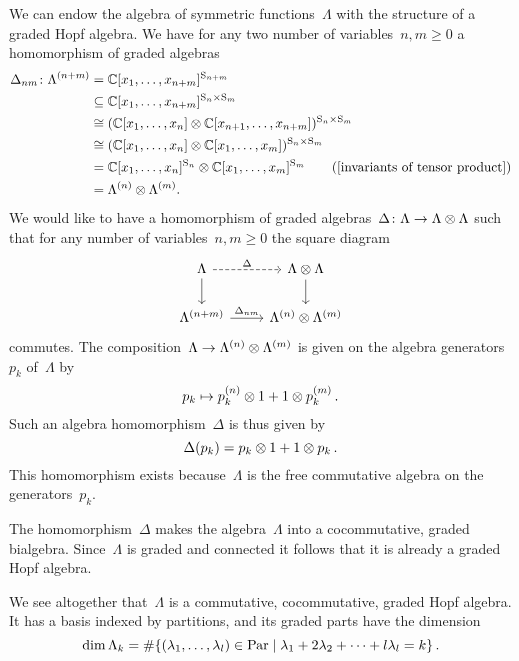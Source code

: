 \documentclass[a4paper,11pt]{scrartcl}
\begin{document}
We can endow the algebra of symmetric functions~$\Lambda$ with the structure of a graded Hopf algebra.
We have for any two number of variables~$n, m \geq 0$ a homomorphism of graded algebras
\begin{align*}
  \Delta_{nm}
  \colon
  \Lambda^{(n+m)}
  &=
  \Complex[x_1, \dotsc, x_{n+m}]^{\symm_{n+m}}
  \\
  &\subseteq
  \Complex[x_1, \dotsc, x_{n+m}]^{\symm_n \times \symm_m}
  \\
  &\cong
  ( \Complex[x_1, \dotsc, x_n] \tensor \Complex[x_{n+1}, \dotsc, x_{n+m}] )^{\symm_n \times \symm_m}
  \\
  &\cong
  ( \Complex[x_1, \dotsc, x_n] \tensor \Complex[x_1, \dotsc, x_m] )^{\symm_n \times \symm_m}
  \\
  &=
  \Complex[x_1, \dotsc, x_n]^{\symm_n} \tensor \Complex[x_1, \dotsc, x_m]^{\symm_m}
  \tag{\cref{invariants of tensor product}}
  \\
  &=
  \Lambda^{(n)} \tensor \Lambda^{(m)}.
\end{align*}
We would like to have a homomorphism of graded algebras~$\Delta \colon \Lambda \to \Lambda \otimes \Lambda$ such that for any number of variables~$n, m \geq 0$ the square diagram
\[
  \begin{tikzcd}
    \Lambda
    \arrow[dashed]{r}[above]{\Delta}
    \arrow{d}
    &
    \Lambda \tensor \Lambda
    \arrow{d}
    \\
    \Lambda^{(n+m)}
    \arrow{r}[above]{\Delta_{nm}}
    &
    \Lambda^{(n)} \tensor \Lambda^{(m)}
  \end{tikzcd}
\]
commutes.
The composition~$\Lambda \to \Lambda^{(n)} \otimes \Lambda^{(m)}$ is given on the algebra generators~$p_k$ of~$\Lambda$ by
\[
  p_k \mapsto p^{(n)}_k \otimes 1 + 1 \otimes p^{(m)}_k \,.
\]
Such an algebra homomorphism~$\Delta$ is thus given by
\[
  \Delta(p_k) = p_k \otimes 1 + 1 \otimes p_k \,.  
\]
This homomorphism exists because~$\Lambda$ is the free commutative algebra on the generators~$p_k$.

The homomorphism~$\Delta$ makes the algebra~$\Lambda$ into a cocommutative, graded bialgebra.
Since~$\Lambda$ is graded and connected it follows that it is already a graded Hopf algebra.

We see altogether that~$\Lambda$ is a commutative, cocommutative, graded Hopf algebra.
It has a basis indexed by partitions, and its graded parts have the dimension
\[
  \dim \Lambda_k
  =
  \counting
  \{
    (\lambda_1, \dotsc, \lambda_l) \in \Par
  \suchthat
    \lambda_1 + 2 \lambda_2 + \dotsb + l \lambda_l
    =
    k
  \} \,.
\]
\end{document}
